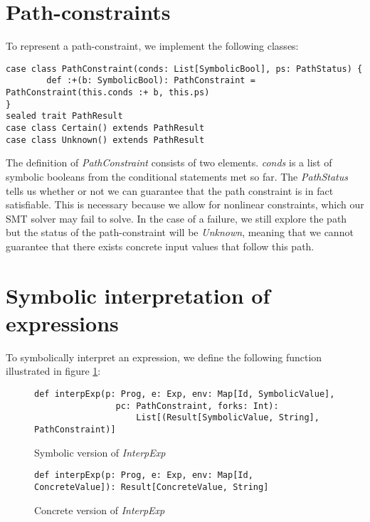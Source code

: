 \section{Path-constraints}
To represent a path-constraint, we implement the following classes:

\begin{lstlisting}[style=simple]
case class PathConstraint(conds: List[SymbolicBool], ps: PathStatus) {
		def :+(b: SymbolicBool): PathConstraint = PathConstraint(this.conds :+ b, this.ps)
}
sealed trait PathResult
case class Certain() extends PathResult
case class Unknown() extends PathResult
\end{lstlisting}

The definition of \textsl{PathConstraint} consists of two elements. \textsl{conds} is a  list of symbolic booleans from the conditional statements met so far. The \textsl{PathStatus} tells us whether or not we can guarantee that the path constraint is in fact satisfiable. This is necessary because we allow for nonlinear constraints, which our SMT solver may fail to solve. In the case of a failure, we still explore the path but the status of the path-constraint will be \textsl{Unknown}, meaning that we cannot guarantee that there exists concrete input values that follow this path.

\section{Symbolic interpretation of expressions}
To symbolically interpret an expression, we define the following function illustrated in figure \ref{interpExpSymbolic}:

\begin{figure}[!h]
	\begin{lstlisting}[style = simple]
		def interpExp(p: Prog, e: Exp, env: Map[Id, SymbolicValue], 
				pc: PathConstraint, forks: Int): 		
					List[(Result[SymbolicValue, String], PathConstraint)]
	\end{lstlisting}
	\caption{Symbolic version of \textsl{InterpExp}}	
	\label{interpExpSymbolic}
\end{figure}

\begin{figure}[!h]
	\begin{lstlisting}[style = simple]
		def interpExp(p: Prog, e: Exp, env: Map[Id, ConcreteValue]): Result[ConcreteValue, String]
	\end{lstlisting}
	\caption{Concrete version of \textsl{InterpExp}}
	\label{interpExpConcrete}
\end{figure}
\newpage

